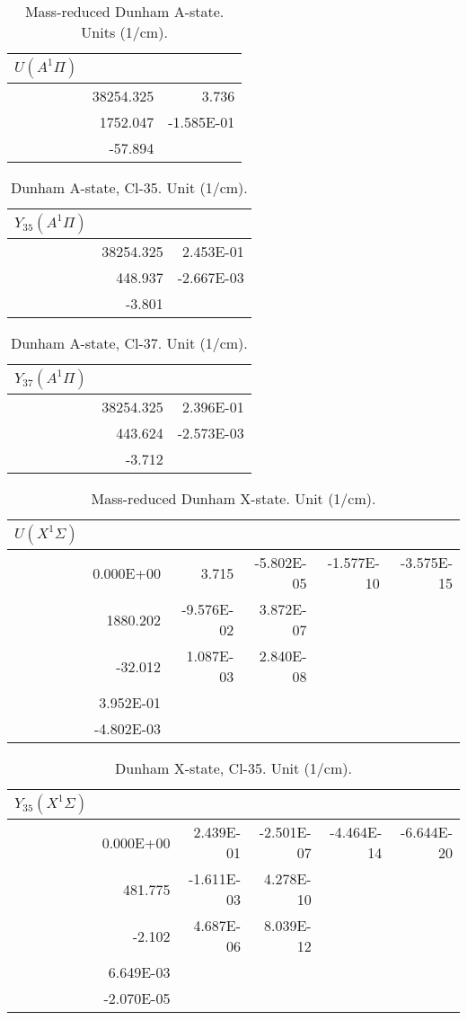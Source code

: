 \begin{table}
\begin{tabular}{crr}
\toprule
$U (A^1\Pi)$\\ \midrule 
& 38254.325 & 3.736 \\
& 1752.047 & -1.585E-01 \\
& -57.894 \\
\bottomrule
\end{tabular}\caption{Mass-reduced Dunham A-state. Units (1/cm).}\end{table}
\begin{table}
\begin{tabular}{crr}
\toprule
$Y_{35} (A^1\Pi)$\\ \midrule 
& 38254.325 & 2.453E-01 \\
& 448.937 & -2.667E-03 \\
& -3.801 \\
\bottomrule
\end{tabular}\caption{Dunham A-state, Cl-35. Unit (1/cm).}\end{table}
\begin{table}
\begin{tabular}{crr}
\toprule
$Y_{37} (A^1\Pi)$\\ \midrule 
& 38254.325 & 2.396E-01 \\
& 443.624 & -2.573E-03 \\
& -3.712 \\
\bottomrule
\end{tabular}\caption{Dunham A-state, Cl-37. Unit (1/cm).}\end{table}
\begin{table}
\begin{tabular}{crrrrr}
\toprule
$U (X^1\Sigma)$\\ \midrule 
& 0.000E+00 & 3.715 & -5.802E-05 & -1.577E-10 & -3.575E-15 \\
& 1880.202 & -9.576E-02 & 3.872E-07 \\
& -32.012 & 1.087E-03 & 2.840E-08 \\
& 3.952E-01 \\
& -4.802E-03 \\
\bottomrule
\end{tabular}\caption{Mass-reduced Dunham X-state. Unit (1/cm).}\end{table}
\begin{table}
\begin{tabular}{crrrrr}
\toprule
$Y_{35} (X^1\Sigma)$\\ \midrule 
& 0.000E+00 & 2.439E-01 & -2.501E-07 & -4.464E-14 & -6.644E-20 \\
& 481.775 & -1.611E-03 & 4.278E-10 \\
& -2.102 & 4.687E-06 & 8.039E-12 \\
& 6.649E-03 \\
& -2.070E-05 \\
\bottomrule
\end{tabular}\caption{Dunham X-state, Cl-35. Unit (1/cm).}\end{table}
